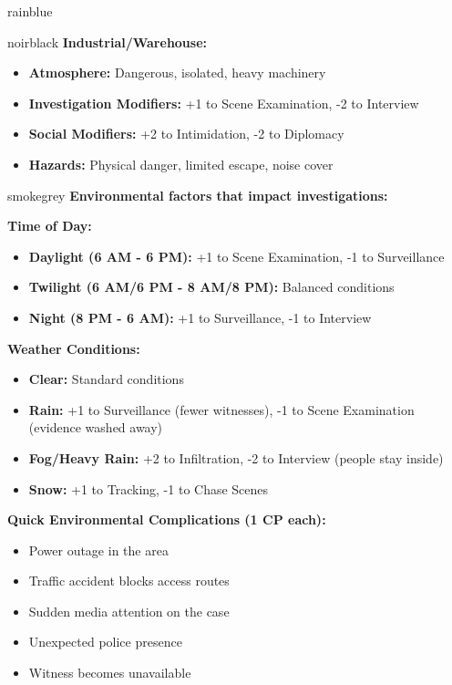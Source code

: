 \documentclass[11pt]{article}
\begin{document}
\begin{noirsection}{rainblue}
\begin{mechanicbox}{noirblack}
\textbf{Industrial/Warehouse:}
\begin{itemize}
    \item \textbf{Atmosphere:} Dangerous, isolated, heavy machinery
    \item \textbf{Investigation Modifiers:} +1 to Scene Examination, -2 to Interview
    \item \textbf{Social Modifiers:} +2 to Intimidation, -2 to Diplomacy
    \item \textbf{Hazards:} Physical danger, limited escape, noise cover
\end{itemize}
\end{mechanicbox}

\begin{mechanicbox}{smokegrey}
\textbf{Environmental factors that impact investigations:}

\textbf{Time of Day:}
\begin{itemize}
    \item \textbf{Daylight (6 AM - 6 PM):} +1 to Scene Examination, -1 to Surveillance
    \item \textbf{Twilight (6 AM/6 PM - 8 AM/8 PM):} Balanced conditions
    \item \textbf{Night (8 PM - 6 AM):} +1 to Surveillance, -1 to Interview
\end{itemize}

\textbf{Weather Conditions:}
\begin{itemize}
    \item \textbf{Clear:} Standard conditions
    \item \textbf{Rain:} +1 to Surveillance (fewer witnesses), -1 to Scene Examination (evidence washed away)
    \item \textbf{Fog/Heavy Rain:} +2 to Infiltration, -2 to Interview (people stay inside)
    \item \textbf{Snow:} +1 to Tracking, -1 to Chase Scenes
\end{itemize}

\textbf{Quick Environmental Complications (1 CP each):}
\begin{itemize}
    \item Power outage in the area
    \item Traffic accident blocks access routes
    \item Sudden media attention on the case
    \item Unexpected police presence
    \item Witness becomes unavailable
\end{itemize}
\end{mechanicbox}
\end{noirsection}
\end{document}
